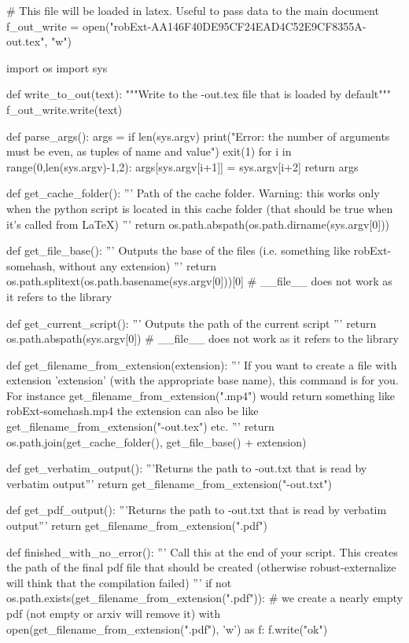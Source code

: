 
# This file will be loaded in latex. Useful to pass data to the main document
f_out_write = open("robExt-AA146F40DE95CF24EAD4C52E9CF8355A-out.tex", "w")

import os
import sys

def write_to_out(text):
    """Write to the -out.tex file that is loaded by default"""
    f_out_write.write(text)

def parse_args():
    args = {}
    if len(sys.argv) %
        print("Error: the number of arguments must be even, as tuples of name and value")
        exit(1)
    for i in range(0,len(sys.argv)-1,2):
        args[sys.argv[i+1]] = sys.argv[i+2]
    return args

def get_cache_folder():
    '''
    Path of the cache folder. Warning: this works only when the python script
    is located in this cache folder (that should be true when it's called from LaTeX)
    '''
    return os.path.abspath(os.path.dirname(sys.argv[0]))

def get_file_base():
    '''
    Outputs the base of the files (i.e. something like robExt-somehash, without any extension)
    '''
    return os.path.splitext(os.path.basename(sys.argv[0]))[0] # __file__ does not work as it refers to the library

def get_current_script():
    '''
    Outputs the path of the current script
    '''
    return os.path.abspath(sys.argv[0]) # __file__ does not work as it refers to the library


def get_filename_from_extension(extension):
    '''
    If you want to create a file with extension 'extension' (with the appropriate base name), this command
    is for you. For instance get_filename_from_extension(".mp4") would return something like
    robExt-somehash.mp4
    the extension can also be like get_filename_from_extension("-out.tex") etc.
    '''
    return os.path.join(get_cache_folder(), get_file_base() + extension)

def get_verbatim_output():
    '''Returns the path to -out.txt that is read by verbatim output'''
    return get_filename_from_extension("-out.txt")

def get_pdf_output():
    '''Returns the path to -out.txt that is read by verbatim output'''
    return get_filename_from_extension(".pdf")


def finished_with_no_error():
    '''
    Call this at the end of your script. This creates the path of the final pdf file that should be
    created (otherwise robust-externalize will think that the compilation failed)
    '''
    if not os.path.exists(get_filename_from_extension(".pdf")):
        # we create a nearly empty pdf (not empty or arxiv will remove it)
        with open(get_filename_from_extension(".pdf"), 'w') as f:
            f.write("ok")

